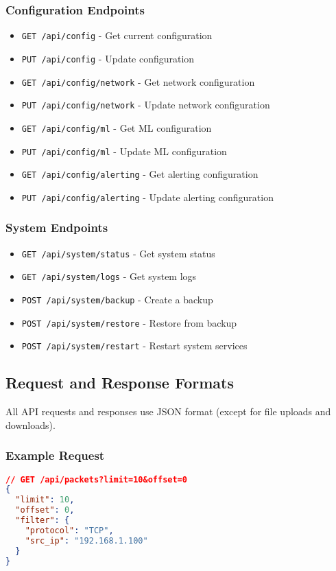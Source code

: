 \subsubsection{Configuration Endpoints}
\begin{itemize}
    \item \texttt{GET /api/config} - Get current configuration
    \item \texttt{PUT /api/config} - Update configuration
    \item \texttt{GET /api/config/network} - Get network configuration
    \item \texttt{PUT /api/config/network} - Update network configuration
    \item \texttt{GET /api/config/ml} - Get ML configuration
    \item \texttt{PUT /api/config/ml} - Update ML configuration
    \item \texttt{GET /api/config/alerting} - Get alerting configuration
    \item \texttt{PUT /api/config/alerting} - Update alerting configuration
\end{itemize}

\subsubsection{System Endpoints}
\begin{itemize}
    \item \texttt{GET /api/system/status} - Get system status
    \item \texttt{GET /api/system/logs} - Get system logs
    \item \texttt{POST /api/system/backup} - Create a backup
    \item \texttt{POST /api/system/restore} - Restore from backup
    \item \texttt{POST /api/system/restart} - Restart system services
\end{itemize}

\subsection{Request and Response Formats}
All API requests and responses use JSON format (except for file uploads and downloads).

\subsubsection{Example Request}
\begin{lstlisting}[language=json, caption=Example API Request]
// GET /api/packets?limit=10&offset=0
{
  "limit": 10,
  "offset": 0,
  "filter": {
    "protocol": "TCP",
    "src_ip": "192.168.1.100"
  }
}
\end{lstlisting}

